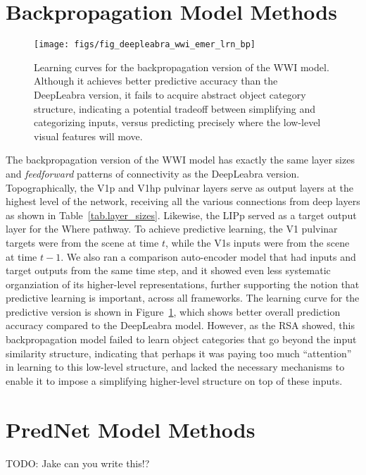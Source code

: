 \documentclass[12pt,twoside]{article}
\newif\myifpdf
\begin{document}
\section{Backpropagation Model Methods}


\begin{figure}
  \centering\texttt{[image: figs/fig\_deepleabra\_wwi\_emer\_lrn\_bp]}
  \caption{Learning curves for the backpropagation version of the WWI model.  Although it achieves better predictive accuracy than the DeepLeabra version, it fails to acquire abstract object category structure, indicating a potential tradeoff between simplifying and categorizing inputs, versus predicting precisely where the low-level visual features will move.}
  \label{fig.bp_lrn}
\end{figure}

The backpropagation version of the WWI model has exactly the same layer sizes and {\em feedforward} patterns of connectivity as the DeepLeabra version.  Topographically, the V1p and V1hp pulvinar layers serve as output layers at the highest level of the network, receiving all the various connections from deep layers as shown in Table~\ref{tab.layer_sizes}.  Likewise, the LIPp served as a target output layer for the Where pathway.  To achieve predictive learning, the V1 pulvinar targets were from the scene at time $t$, while the V1s inputs were from the scene at time $t-1$.  We also ran a comparison auto-encoder model that had inputs and target outputs from the same time step, and it showed even less systematic organziation of its higher-level representations, further supporting the notion that predictive learning is important, across all frameworks.  The learning curve for the predictive version is shown in Figure~\ref{fig.bp_lrn}, which shows better overall prediction accuracy compared to the DeepLeabra model.  However, as the RSA showed, this backpropagation model failed to learn object categories that go beyond the input similarity structure, indicating that perhaps it was paying too much ``attention'' in learning to this low-level structure, and lacked the necessary mechanisms to enable it to impose a simplifying higher-level structure on top of these inputs.

\section{PredNet Model Methods}

TODO: Jake can you write this!?


\end{document}

